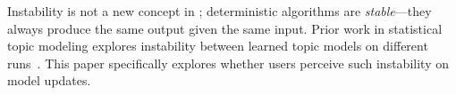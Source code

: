 Instability is not a new concept in ; deterministic algorithms
are \textit{stable}---they always produce the same output given the
same input. Prior work in statistical topic modeling explores
instability between learned topic models on different
runs~\cite{greene2014many,belford2018stability}. This paper
specifically explores whether users perceive such instability on model
updates.


